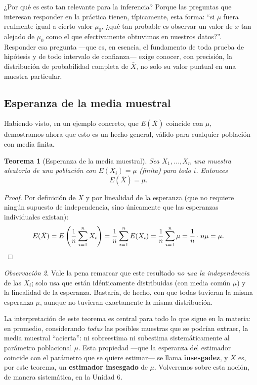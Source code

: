 \documentclass[11pt,a4paper]{article}
\theoremstyle{plain}
\newtheorem{teorema}{Teorema}[section]
\theoremstyle{definition}
\theoremstyle{remark}
\newtheorem{observacion}[teorema]{Observación}
\begin{document}
¿Por qué es esto tan relevante para la inferencia? Porque las preguntas que interesan responder en la práctica tienen, típicamente, esta forma: ``si $\mu$ fuera realmente igual a cierto valor $\mu_0$, ¿qué tan probable es observar un valor de $\bar x$ tan alejado de $\mu_0$ como el que efectivamente obtuvimos en nuestros datos?''. Responder esa pregunta —que es, en esencia, el fundamento de toda prueba de hipótesis y de todo intervalo de confianza— exige conocer, con precisión, la distribución de probabilidad completa de $\bar X$, no solo su valor puntual en una muestra particular.

\subsection{Esperanza de la media muestral}

Habiendo visto, en un ejemplo concreto, que $E(\bar X)$ coincide con $\mu$, demostramos ahora que esto es un hecho general, válido para cualquier población con media finita.

\begin{teorema}[Esperanza de la media muestral]
\label{teo:esperanza-xbarra}
Sea $X_1,\dots,X_n$ una muestra aleatoria de una población con $E(X_i)=\mu$ (finita) para todo $i$. Entonces
$$E(\bar X) = \mu.$$
\end{teorema}

\begin{proof}
Por definición de $\bar X$ y por linealidad de la esperanza (que no requiere ningún supuesto de independencia, sino únicamente que las esperanzas individuales existan):
$$E(\bar X) = E\left(\frac{1}{n}\sum_{i=1}^n X_i\right) = \frac{1}{n}\sum_{i=1}^n E(X_i) = \frac{1}{n}\sum_{i=1}^n \mu = \frac{1}{n}\cdot n\mu = \mu. \qedhere$$
\end{proof}

\begin{observacion}
Vale la pena remarcar que este resultado \emph{no usa la independencia} de las $X_i$; solo usa que están idénticamente distribuidas (con media común $\mu$) y la linealidad de la esperanza. Bastaría, de hecho, con que todas tuvieran la misma esperanza $\mu$, aunque no tuvieran exactamente la misma distribución.
\end{observacion}

La interpretación de este teorema es central para todo lo que sigue en la materia: en promedio, considerando \emph{todas} las posibles muestras que se podrían extraer, la media muestral ``acierta'': ni sobreestima ni subestima sistemáticamente al parámetro poblacional $\mu$. Esta propiedad —que la esperanza del estimador coincide con el parámetro que se quiere estimar— se llama \textbf{insesgadez}, y $\bar X$ es, por este teorema, un \textbf{estimador insesgado} de $\mu$. Volveremos sobre esta noción, de manera sistemática, en la Unidad 6.
\end{document}
